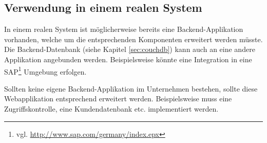 \subsection{Verwendung in einem realen System}

In einem realen System ist möglicherweise bereits eine Backend-Applikation
	vorhanden, welche um die entsprechenden Komponenten erweitert werden
	müsste. Die Backend-Datenbank (siehe Kapitel \ref{sec:couchdb}) kann
	auch an eine andere Applikation angebunden werden. Beispielsweise
	könnte eine Integration in eine SAP\footnote{vgl.
	\url{http://www.sap.com/germany/index.epx}} Umgebung erfolgen.
	
Sollten keine eigene Backend-Applikation im Unternehmen bestehen, sollte
	diese Webapplikation entsprechend erweitert werden. Beispielsweise
	muss eine Zugriffskontrolle, eine Kundendatenbank etc. implementiert
	werden.